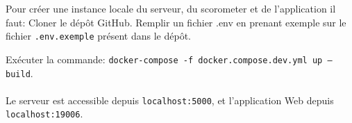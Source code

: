 Pour créer une instance locale du serveur, du scorometer et de l’application il faut:
Cloner le dépôt GitHub.
Remplir un fichier .env en prenant exemple sur le fichier \verb|.env.exemple| présent dans le dépôt.

Exécuter la commande: \verb|docker-compose -f docker.compose.dev.yml up –build|.
\\\\
Le serveur est accessible depuis \verb|localhost:5000|, et l’application Web depuis \verb|localhost:19006|.


